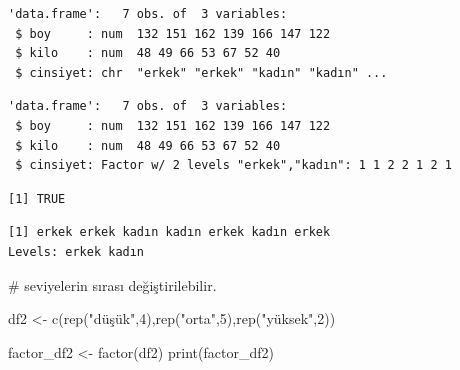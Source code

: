 \documentclass[
  letterpaper,
  DIV=11,
  numbers=noendperiod]{scrreprt}
\newenvironment{Shaded}{\begin{snugshade}}{\end{snugshade}}
\newcommand{\CommentTok}[1]{\textcolor[rgb]{0.37,0.37,0.37}{#1}}
\newcommand{\DecValTok}[1]{\textcolor[rgb]{0.68,0.00,0.00}{#1}}
\newcommand{\FunctionTok}[1]{\textcolor[rgb]{0.28,0.35,0.67}{#1}}
\newcommand{\NormalTok}[1]{\textcolor[rgb]{0.00,0.23,0.31}{#1}}
\newcommand{\OtherTok}[1]{\textcolor[rgb]{0.00,0.23,0.31}{#1}}
\newcommand{\SpecialCharTok}[1]{\textcolor[rgb]{0.37,0.37,0.37}{#1}}
\newcommand{\StringTok}[1]{\textcolor[rgb]{0.13,0.47,0.30}{#1}}
\begin{document}
\begin{verbatim}
'data.frame':   7 obs. of  3 variables:
 $ boy     : num  132 151 162 139 166 147 122
 $ kilo    : num  48 49 66 53 67 52 40
 $ cinsiyet: chr  "erkek" "erkek" "kadın" "kadın" ...
\end{verbatim}

\begin{Shaded}
\end{Shaded}

\begin{verbatim}
'data.frame':   7 obs. of  3 variables:
 $ boy     : num  132 151 162 139 166 147 122
 $ kilo    : num  48 49 66 53 67 52 40
 $ cinsiyet: Factor w/ 2 levels "erkek","kadın": 1 1 2 2 1 2 1
\end{verbatim}

\begin{Shaded}
\end{Shaded}

\begin{verbatim}
[1] TRUE
\end{verbatim}

\begin{Shaded}
\end{Shaded}

\begin{verbatim}
[1] erkek erkek kadın kadın erkek kadın erkek
Levels: erkek kadın
\end{verbatim}

\begin{Shaded}
\begin{Highlighting}[]
\CommentTok{\# seviyelerin sırası değiştirilebilir.}

\NormalTok{df2 }\OtherTok{\textless{}{-}} \FunctionTok{c}\NormalTok{(}\FunctionTok{rep}\NormalTok{(}\StringTok{"düşük"}\NormalTok{,}\DecValTok{4}\NormalTok{),}\FunctionTok{rep}\NormalTok{(}\StringTok{"orta"}\NormalTok{,}\DecValTok{5}\NormalTok{),}\FunctionTok{rep}\NormalTok{(}\StringTok{"yüksek"}\NormalTok{,}\DecValTok{2}\NormalTok{))}

\NormalTok{factor\_df2 }\OtherTok{\textless{}{-}} \FunctionTok{factor}\NormalTok{(df2)}
\FunctionTok{print}\NormalTok{(factor\_df2)}
\end{Highlighting}
\end{Shaded}
\end{document}
